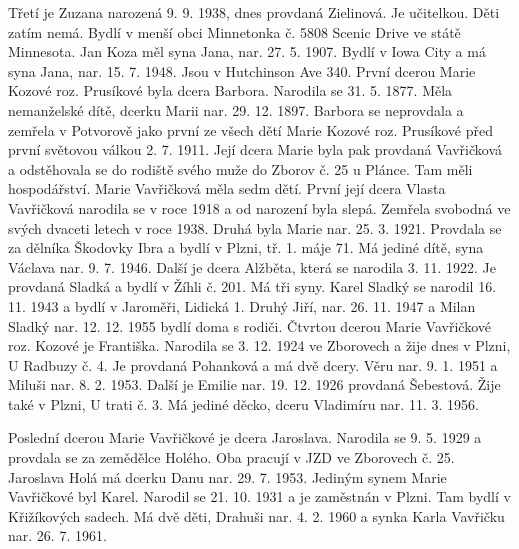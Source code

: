 \documentclass[../dejiny-rodu-prusiku.tex]{subfiles}
\begin{document}
Třetí je Zuzana narozená 9. 9. 1938, dnes provdaná Zielinová. Je učitelkou. Děti zatím nemá. Bydlí v men­ší obci Minnetonka č. 5808 Scenic Drive ve státě Minnesota. Jan Koza měl syna Jana, nar. 27. 5. 1907. Bydlí v Iowa City a má syna Jana, nar. 15. 7. 1948. Jsou v Hutchinson Ave 340. První dcerou Marie Kozové roz. Prusíkové byla dcera Barbora. Narodila se 31. 5. 1877. Měla nemanželské dítě, dcerku Marii nar. 29. 12. 1897. Barbora se neprovdala a zemřela v Potvorově jako první ze všech dětí Marie Ko­zové roz. Prusíkové před první světovou válkou 2. 7. 1911. Její dcera Marie byla pak provdaná Vavřičková a odstě­hovala se do rodiště svého muže do Zborov č. 25 u Plánce. Tam měli hospodářství. Marie Vavřičková měla sedm
dětí. První její dcera Vlasta Vavřičková narodila se v roce 1918 a od narození byla slepá. Zemřela svobodná ve svých dvaceti letech v roce 1938. Druhá byla Marie nar. 25. 3. 1921. Provdala se za děl­níka Škodovky Ibra a bydlí v Plzni, tř. 1. máje 71. Má jediné dítě, syna Václava nar. 9. 7. 1946. Další je dcera Alžběta, která se narodila 3. 11. 1922. Je provdaná Sladká a bydlí v Žíhli č. 201. Má tři syny. Karel Sladký se narodil 16. 11. 1943 a bydlí v Jaroměři, Lidická 1. Druhý Jiří, nar. 26. 11. 1947 a Milan Sladký nar. 12. 12. 1955 bydlí doma s rodiči. Čtvrtou dcerou Marie Vavřičkové roz. Kozové je Františ­ka. Narodila se 3. 12. 1924 ve Zborovech a žije dnes v Plzni, U Radbuzy č. 4. Je provdaná Pohanková a má dvě dcery. Věru nar. 9. 1. 1951 a Miluši nar. 8. 2. 1953. Další je Emilie nar. 19. 12. 1926 provdaná Šebestová. Žije také v Plzni, U trati č. 3. Má jediné děcko, dceru Vladimíru nar. 11. 3. 1956.

Poslední dcerou Marie Vavřičkové je dcera Jaroslava. Narodila se 9. 5. 1929 a provdala se za zemědělce Holého. Oba pracují v JZD ve Zborovech č. 25. Jaroslava Holá má dcerku Danu nar. 29. 7. 1953. Jediným synem Marie Vavřičkové byl Karel. Narodil se 21. 10. 1931 a je zaměstnán v Plzni. Tam bydlí v Křižíko­vých sadech. Má dvě děti, Drahuši nar. 4. 2. 1960 a synka Karla Vavřičku nar. 26. 7. 1961.
\end{document}
